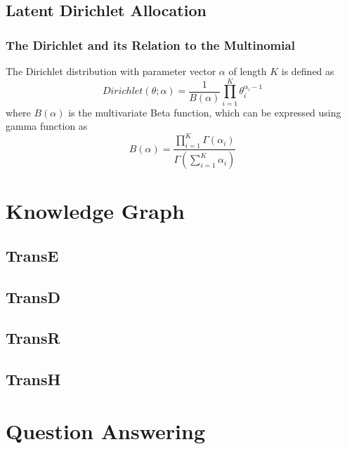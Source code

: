 \documentclass[a4paper, 12pt]{book} %
\begin{document}
\section{Latent Dirichlet Allocation}
\subsection{The Dirichlet and its Relation to the Multinomial}
The Dirichlet distribution with parameter vector $\alpha$ of length $K$ is defined as 
\begin{equation}
Dirichlet(\theta;\alpha)=\frac{1}{B{(\alpha)}}\prod_{i=1}^{K}{\theta_i^{\alpha_i-1}}
\end{equation}
where $B(\alpha)$ is the multivariate Beta function, which can be expressed using gamma function as 
\begin{equation}
B(\alpha)=\frac{\prod_{i=1}^{K}{\Gamma{(\alpha_i)}}}{\Gamma{(\sum_{i=1}^{K}{\alpha_i})}}
\end{equation}



\chapter{Knowledge Graph}
\section{TransE}
\section{TransD}
\section{TransR}
\section{TransH}



\chapter{Question Answering}
\end{document}
